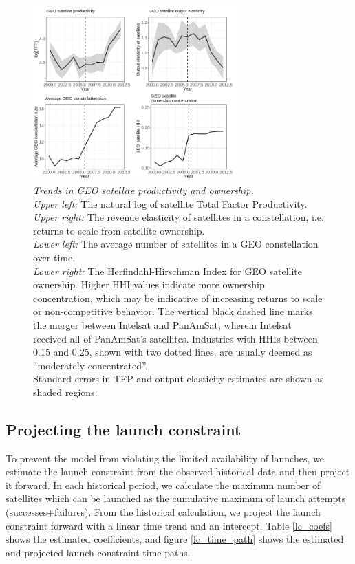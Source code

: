 \documentclass[12pt]{article}
\begin{document}
\begin{figure}[H]
	\centering
	\includegraphics[width=0.7\textwidth]{../../images/GEO_satellite_productivity.png}
	\captionsetup{format=hang}
	\caption[Trends in GEO satellite productivity and ownership]{\textit{Trends in GEO satellite productivity and ownership.} \\
		\textit{Upper left:} The natural log of satellite Total Factor Productivity. \\
		\textit{Upper right:} The revenue elasticity of satellites in a constellation, i.e. returns to scale from satellite ownership. \\
		\textit{Lower left:} The average number of satellites in a GEO constellation over time. \\
		\textit{Lower right:} The Herfindahl-Hirschman Index for GEO satellite ownership. Higher HHI values indicate more ownership concentration, which may be indicative of increasing returns to scale or non-competitive behavior. The vertical black dashed line marks the merger between Intelsat and PanAmSat, wherein Intelsat received all of PanAmSat's satellites. Industries with HHIs between 0.15 and 0.25, shown with two dotted lines, are usually deemed as ``moderately concentrated''.  \\
		Standard errors in TFP and output elasticity estimates are shown as shaded regions.
	}
	\label{GEO_satellite_productivity}
\end{figure}

\subsection{Projecting the launch constraint}
\label{launch_constraint}

To prevent the model from violating the limited availability of launches, we estimate the launch constraint from the observed historical data and then project it forward. In each historical period, we calculate the maximum number of satellites which can be launched as the cumulative maximum of launch attempts (successes+failures). From the historical calculation, we project the launch constraint forward with a linear time trend and an intercept. Table \ref{lc_coefs} shows the estimated coefficients, and figure \ref{lc_time_path} shows the estimated and projected launch constraint time paths.
\end{document}
